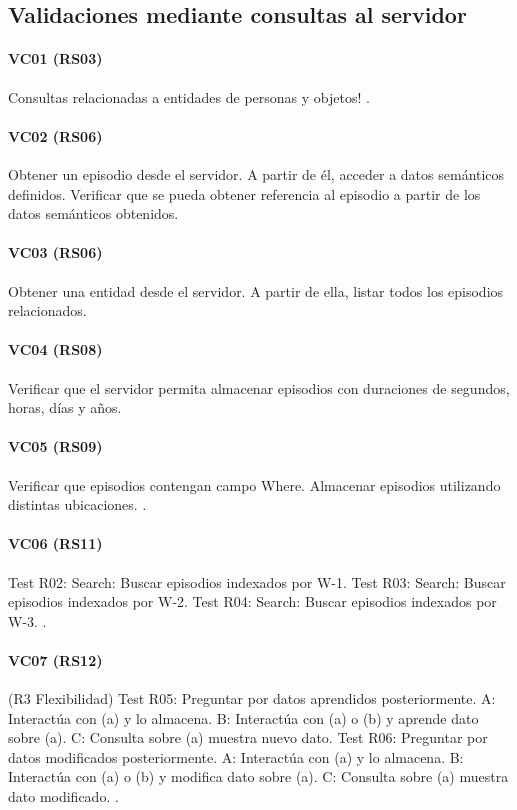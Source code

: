 \subsection{Validaciones mediante consultas al servidor}

\paragraph{VC01 (RS03)}
Consultas relacionadas a entidades de personas y objetos!
.


\paragraph{VC02 (RS06)}
Obtener un episodio desde el servidor. A partir de él, acceder a datos semánticos definidos. Verificar que se pueda obtener referencia al episodio a partir de los datos semánticos obtenidos.

\paragraph{VC03 (RS06)}
Obtener una entidad desde el servidor. A partir de ella, listar todos los episodios relacionados.

\paragraph{VC04 (RS08)}
Verificar que el servidor permita almacenar episodios con duraciones de segundos, horas, días y años.

\paragraph{VC05 (RS09)}
Verificar que episodios contengan campo Where. Almacenar episodios utilizando distintas ubicaciones.
.


\paragraph{VC06 (RS11)}
Test R02: Search: Buscar episodios indexados por W-1.
Test R03: Search: Buscar episodios indexados por W-2.
Test R04: Search: Buscar episodios indexados por W-3.
.


\paragraph{VC07 (RS12)}
(R3 Flexibilidad)
Test R05: Preguntar por datos aprendidos posteriormente.
A: Interactúa con (a) y lo almacena.
B: Interactúa con (a) o (b) y aprende dato sobre (a).
C: Consulta sobre (a) muestra nuevo dato.
Test R06: Preguntar por datos modificados posteriormente.
A: Interactúa con (a) y lo almacena.
B: Interactúa con (a) o (b) y modifica dato sobre (a).
C: Consulta sobre (a) muestra dato modificado.
.


